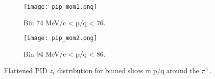 \begin{figure}[!htb]
    \centering
    \begin{subfigure}[t]{0.49\textwidth}
        \centering
        \texttt{[image: pip\_mom1.png]}
        \caption{Bin 74 MeV/c < p/q < 76. } \label{fig:pipmom1}
    \end{subfigure}
    \hfill
    \begin{subfigure}[t]{.49\textwidth}
        \centering
        \texttt{[image: pip\_mom2.png]} 
        \caption{Bin 94 MeV/c < p/q < 86.} \label{fig:pipmom2}
    \end{subfigure}
  
    \caption{Flattened PID $z_i$ distribution  for binned slices in p/q around the $\pi^+$.}
\label{fig:pipmom_flat}
\end{figure}
